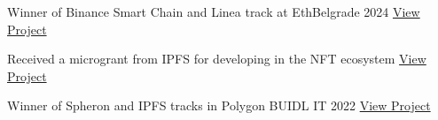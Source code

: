 \documentclass[letter,10pt]{article}
\begin{document}
\begin{zitemize}
    \item Winner of Binance Smart Chain and Linea track at EthBelgrade 2024 \hfill \href{https://t.co/V28cLMQW9K}{View Project}
    \item Received a microgrant from IPFS for developing in the NFT ecosystem \hfill \href{https://github.com/ipfs/devgrants/issues/272}{View Project}
    \item Winner of Spheron and IPFS tracks in Polygon BUIDL IT 2022 \hfill \href{https://devpost.com/software/moog3}{View Project}
\end{zitemize}
\end{document}
